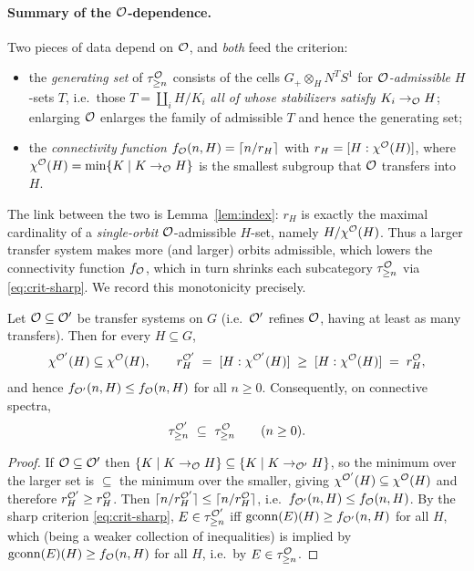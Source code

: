 \paragraph{Summary of the $\mathcal{O}$-dependence.}
Two pieces of data depend on $\mathcal{O}$, and \emph{both} feed the criterion:
\begin{itemize}\setlength\itemsep{2pt}
\item the \emph{generating set} of $\tau^{\mathcal{O}}_{\ge n}$ consists of the cells
$G_+\otimes_H N^{T}S^1$ for \emph{$\mathcal{O}$-admissible} $H$-sets $T$, i.e.\ those
$T=\coprod_i H/K_i$ \emph{all of whose stabilizers satisfy $K_i\to_{\mathcal{O}} H$};
enlarging $\mathcal{O}$ enlarges the family of admissible $T$ and hence the generating
set;
\item the \emph{connectivity function}
$f_{\mathcal{O}}(n,H)=\lceil n/r_H\rceil$ with $r_H=[H:\chi^{\mathcal{O}}(H)]$, where
$\chi^{\mathcal{O}}(H)=\min\{K\mid K\to_{\mathcal{O}} H\}$ is the smallest subgroup that
$\mathcal{O}$ transfers into $H$.
\end{itemize}
The link between the two is Lemma~\ref{lem:index}: $r_H$ is exactly the maximal
cardinality of a \emph{single-orbit} $\mathcal{O}$-admissible $H$-set, namely
$H/\chi^{\mathcal{O}}(H)$. Thus a larger transfer system makes more (and larger) orbits
admissible, which lowers the connectivity function $f_{\mathcal{O}}$, which in turn
shrinks each subcategory $\tau^{\mathcal{O}}_{\ge n}$ via \eqref{eq:crit-sharp}. We
record this monotonicity precisely.

\begin{qfiveproposition}\label{prop:monotone}
Let $\mathcal{O}\subseteq\mathcal{O}'$ be transfer systems on $G$ (i.e.\ $\mathcal{O}'$ refines
$\mathcal{O}$, having at least as many transfers). Then for every $H\subseteq G$,
\[
\chi^{\mathcal{O}'}(H)\subseteq\chi^{\mathcal{O}}(H),
\qquad
r^{\mathcal{O}'}_H\;=\;[H:\chi^{\mathcal{O}'}(H)]\;\ge\;[H:\chi^{\mathcal{O}}(H)]\;=\;r^{\mathcal{O}}_H,
\]
and hence $f_{\mathcal{O}'}(n,H)\le f_{\mathcal{O}}(n,H)$ for all $n\ge0$. Consequently, on
connective spectra,
\[
\tau^{\qfiveaO'}_{\ge n}\ \subseteq\ \tau^{\qfiveaO}_{\ge n}\qquad(n\ge0).
\]
\end{qfiveproposition}

\begin{proof}
If $\mathcal{O}\subseteq\mathcal{O}'$ then $\{K\mid K\to_{\mathcal{O}} H\}\subseteq\{K\mid
K\to_{\mathcal{O}'}H\}$, so the minimum over the larger set is $\subseteq$ the minimum
over the smaller, giving $\chi^{\mathcal{O}'}(H)\subseteq\chi^{\mathcal{O}}(H)$ and therefore
$r^{\mathcal{O}'}_H\ge r^{\mathcal{O}}_H$. Then $\lceil n/r^{\mathcal{O}'}_H\rceil\le\lceil
n/r^{\mathcal{O}}_H\rceil$, i.e.\ $f_{\mathcal{O}'}(n,H)\le f_{\mathcal{O}}(n,H)$. By the sharp
criterion \eqref{eq:crit-sharp}, $E\in\tau^{\mathcal{O}'}_{\ge n}$ iff
$\operatorname{gconn}(E)(H)\ge f_{\mathcal{O}'}(n,H)$ for all $H$, which (being a weaker
collection of inequalities) is implied by $\operatorname{gconn}(E)(H)\ge f_{\mathcal{O}}(n,H)$ for
all $H$, i.e.\ by $E\in\tau^{\mathcal{O}}_{\ge n}$.
\end{proof}

